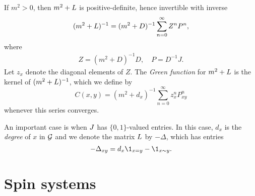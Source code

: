 If $m^2 > 0$, then $m^2 + L$ is positive-definite, hence invertible with inverse
\begin{equation}
(m^2 + L)^{-1} = (m^2 + D)^{-1} \sum_{n=0}^\infty Z^n P^n,
\end{equation}
where
\begin{align}
Z = (m^2 + D)^{-1} D,
  \quad
P = D^{-1} J.
\end{align}
Let $z_x$ denote the diagonal elements of $Z$.
The \emph{Green function} for $m^2 + L$ is the kernel of $(m^2 + L)^{-1}$, which we define by
\begin{equation}
C(x, y)
  =
(m^2 + d_x)^{-1} \sum_{n=0}^\infty z_x^n P^n_{xy}
\end{equation}
whenever this series converges.

\begin{example}
An important case is when $J$ has $\{0, 1 \}$-valued entries. In this case, $d_x$ is the
\emph{degree} of $x$ in $\mathcal{G}$ and we denote the matrix $L$ by $-\Delta$, which has
entries
\begin{equation}
-\Delta_{xy} = d_x \1_{x=y} - \1_{x \sim y}.
\end{equation}
\end{example}




\section{Spin systems}

